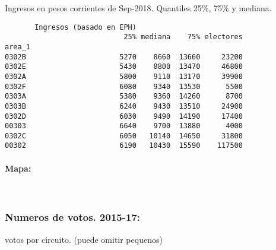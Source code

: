 \documentclass[11pt]{article}
\begin{document}
    
    Ingresos en pesos corrientes de Sep-2018. Quantiles 25\%, 75\% y
mediana.

    
    
    \begin{verbatim}
       Ingresos (basado en EPH)                         
                            25% mediana    75% electores
area_1                                                  
0302B                      5270    8660  13660     23200
0302E                      5430    8800  13470     46800
0302A                      5800    9110  13170     39900
0302F                      6080    9340  13530      5500
0303A                      5380    9360  14260      8700
0303B                      6240    9430  13510     24900
0302D                      6030    9490  14190     17400
00303                      6640    9700  13880      4000
0302C                      6050   10140  14650     31800
00302                      6190   10430  15590    117500
    \end{verbatim}

    
    \hypertarget{mapa}{%
\paragraph{Mapa:}\label{mapa}}

    
    \begin{center}
    \end{center}
    { \hspace*{\fill} \\}
    
    \hypertarget{numeros-de-votos.-2015-17}{%
\subsubsection{Numeros de votos.
2015-17:}\label{numeros-de-votos.-2015-17}}

    
    votos por circuito. (puede omitir pequenos)

    
    
\end{document}
